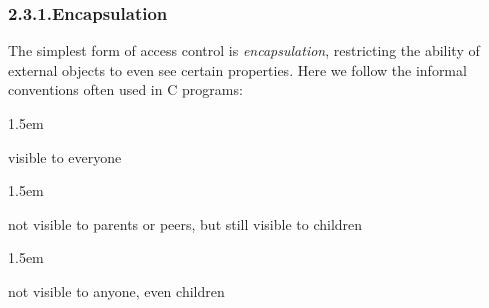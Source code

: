 \documentclass[preprint]{{acmart}}
\begin{document}
\subsubsection{2.3.1.\hspace*{0.5em}Encapsulation}\label{sec-encapsulation}%

\noindent{}The simplest form of access control is \emph{encapsulation}, restricting the ability of
external objects to even see certain properties.  Here we follow the informal
conventions often used in C programs:%

\begin{mddefinitions}%


\begin{mdbmarginx}{}{}{}{1.5em}%
\begin{mddefdata}%
visible to everyone
\end{mddefdata}%
\end{mdbmarginx}%


\begin{mdbmarginx}{}{}{}{1.5em}%
\begin{mddefdata}%
not visible to parents or peers, but still visible to children
\end{mddefdata}%
\end{mdbmarginx}%


\begin{mdbmarginx}{}{}{}{1.5em}%
\begin{mddefdata}%
not visible to anyone, even children%
\end{mddefdata}%
\end{mdbmarginx}%
\end{mddefinitions}%
\end{document}
